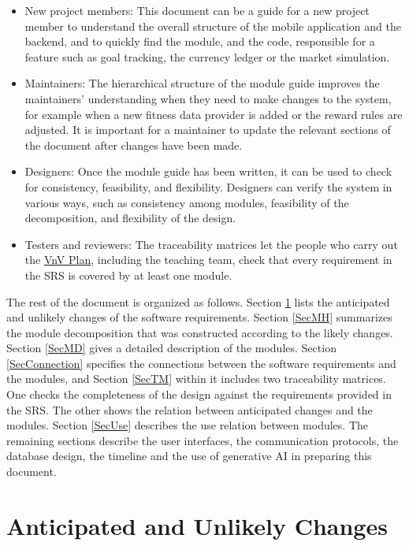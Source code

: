 \documentclass[12pt, titlepage]{article}
\begin{document}
\begin{itemize}
\item New project members: This document can be a guide for a new project
  member to understand the overall structure of the mobile application and the
  backend, and to quickly find the module, and the code, responsible for a
  feature such as goal tracking, the currency ledger or the market simulation.
\item Maintainers: The hierarchical structure of the module guide improves the
  maintainers' understanding when they need to make changes to the system, for
  example when a new fitness data provider is added or the reward rules are
  adjusted. It is important for a maintainer to update the relevant sections of
  the document after changes have been made.
\item Designers: Once the module guide has been written, it can be used to
  check for consistency, feasibility, and flexibility. Designers can verify the
  system in various ways, such as consistency among modules, feasibility of the
  decomposition, and flexibility of the design.
\item Testers and reviewers: The traceability matrices let the people who
  carry out the
  \href{https://github.com/arjunkarthik123/fitness-finance-application/blob/main/pdfs/VnVPlan/VnVPlan.pdf}{VnV Plan},
  including the teaching team, check that every requirement in the SRS is
  covered by at least one module.
\end{itemize}

The rest of the document is organized as follows. Section
\ref{SecChange} lists the anticipated and unlikely changes of the software
requirements. Section \ref{SecMH} summarizes the module decomposition that
was constructed according to the likely changes. Section \ref{SecMD} gives a
detailed description of the modules. Section \ref{SecConnection} specifies the
connections between the software requirements and the modules, and
Section \ref{SecTM} within it includes two traceability matrices. One checks
the completeness of the design against the requirements provided in the SRS. The
other shows the relation between anticipated changes and the modules. Section
\ref{SecUse} describes the use relation between modules. The remaining
sections describe the user interfaces, the communication protocols, the
database design, the timeline and the use of generative AI in preparing this
document.

\section{Anticipated and Unlikely Changes} \label{SecChange}
\end{document}
